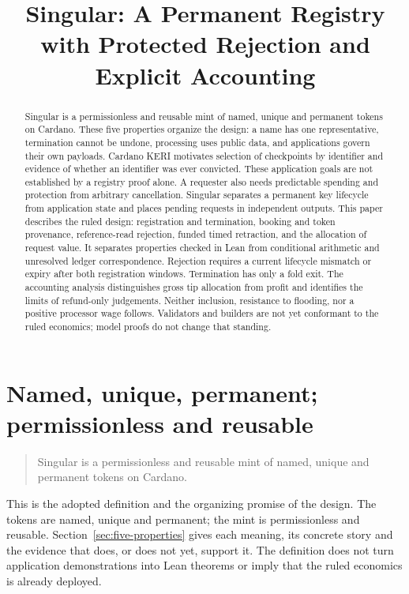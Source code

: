 \documentclass[runningheads]{llncs}
\begin{document}
\title{Singular: A Permanent Registry with Protected Rejection and Explicit Accounting}
\author{}
\institute{}
\maketitle
\begin{abstract}
Singular is a permissionless and reusable mint of named, unique and permanent
tokens on Cardano. These five properties organize the design: a name has one
representative, termination cannot be undone, processing uses public data, and
applications govern their own payloads. Cardano KERI motivates selection of
checkpoints by identifier and evidence of whether an identifier was ever
convicted. These application goals are not established by a registry proof alone.
A requester also needs predictable spending and protection from arbitrary
cancellation. Singular separates a permanent key lifecycle from application state and places
pending requests in independent outputs. This paper describes the ruled design:
registration and termination, booking and token provenance, reference-read
rejection, funded timed retraction, and the allocation of request value. It separates
properties checked in Lean from conditional arithmetic and unresolved ledger
correspondence. Rejection requires a current lifecycle mismatch or expiry after
both registration windows. Termination has only a fold exit. The accounting
analysis distinguishes gross tip allocation from profit and identifies the limits
of refund-only judgements. Neither inclusion, resistance to flooding, nor a
positive processor wage follows. Validators and builders are not yet conformant
to the ruled economics; model proofs do not change that standing.
\end{abstract}

\section{Named, unique, permanent; permissionless and reusable}
\label{sec:introduction}
\begin{quote}
Singular is a permissionless and reusable mint of named, unique and permanent
tokens on Cardano.
\end{quote}
This is the adopted definition and the organizing promise of the design.
The tokens are named, unique and permanent; the mint is permissionless and
reusable. Section~\ref{sec:five-properties} gives each meaning, its concrete
story and the evidence that does, or does not yet, support it. The definition
does not turn application demonstrations into Lean theorems or imply that the
ruled economics is already deployed.
\end{document}

